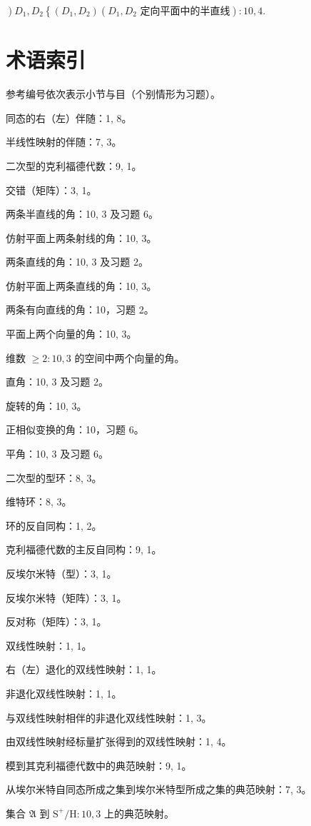\(\left.\right)D_{1}, D_{2}\left\{\left(D_{1}, D_{2}\right)\left(D_{1}, D_{2} \text{ 定向平面中的半直线}\right): 10, 4.\right.\)

\chapter*{术语索引}
{}

参考编号依次表示小节与目（个别情形为习题）。

同态的右（左）伴随：1, 8。

半线性映射的伴随：7, 3。

二次型的克利福德代数：9, 1。

交错（矩阵）：3, 1。

两条半直线的角：10, 3 及习题 6。

仿射平面上两条射线的角：10, 3。

两条直线的角：10, 3 及习题 2。

仿射平面上两条直线的角：10, 3。

两条有向直线的角：10，习题 2。

平面上两个向量的角：10, 3。

维数 \(\geqslant 2:10,3\) 的空间中两个向量的角。

直角：10, 3 及习题 2。

旋转的角：10, 3。

正相似变换的角：10，习题 6。

平角：10, 3 及习题 6。

二次型的型环：8, 3。

维特环：8, 3。

环的反自同构：1, 2。

克利福德代数的主反自同构：9, 1。

反埃尔米特（型）：3, 1。

反埃尔米特（矩阵）：3, 1。

反对称（矩阵）：3, 1。

双线性映射：1, 1。

右（左）退化的双线性映射：1, 1。

非退化双线性映射：1, 1。

与双线性映射相伴的非退化双线性映射：1, 3。

由双线性映射经标量扩张得到的双线性映射：1, 4。

模到其克利福德代数中的典范映射：9, 1。

从埃尔米特自同态所成之集到埃尔米特型所成之集的典范映射：7, 3。

集合 \(\mathfrak{A}\) 到 \(\mathrm{S}^{+}/\mathrm{H}:10,3\) 上的典范映射。


